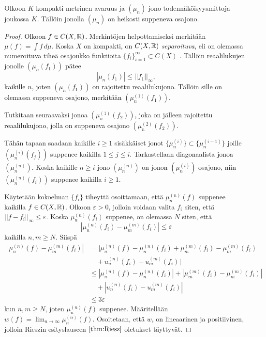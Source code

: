 \documentclass[12pt,oneside,a4paper]{amsbook} %
\begin{document}
\begin{theorem}\label{thm:probmeasureconvergence}
    Olkoon $K$ kompakti metrinen avaruus ja $(\mu_n)$ jono todennäköisyysmittoja joukossa $K$. Tällöin jonolla $(\mu_n)$ on heikosti suppeneva osajono.
\end{theorem}
\begin{proof}
    Olkoon $f \in C(X, \mathbb{R})$. Merkintöjen helpottamiseksi merkitään $\mu(f) = \int f \, d\mu$. Koska $X$ on kompakti, on $C(X, \mathbb{R})$ \textit{separoituva}, eli on olemassa numeroituva tiheä osajoukko funktioita $\{f_i\}_{i = 1}^\infty \subset C(X)$ \cite[s. 140]{conway}. Tällöin reaalilukujen jonolle $(\mu_n(f_1))$ pätee
    \begin{equation}
        |\mu_n(f_1)| \le ||f_1||_\infty,
    \end{equation}
    kaikille $n$, joten $(\mu_n(f_1))$ on rajoitettu reaalilukujono. Tällöin sille on olemassa suppeneva osajono, merkitään $(\mu_n^{(1)}(f_1))$.
    
    Tutkitaan seuraavaksi jonoa $(\mu_n^{(1)}(f_2))$, joka on jälleen rajoitettu reaalilukujono, jolla on suppeneva osajono $(\mu_n^{(2)}(f_2))$.
    
    Tähän tapaan saadaan kaikille $i \ge 1$ sisäkkäiset jonot $\{\mu_n^{(i)}\} \subset \{\mu_n^{(i-1)}\}$ joille $(\mu_n^{(i)}(f_j))$ suppenee kaikilla $1 \le j \le i$. Tarkastellaan diagonaalista jonoa $(\mu_n^{(n)})$. Koska kaikille $n \ge i$ jono $(\mu_n^{(n)})$ on jonon $(\mu_n^{(i)})$ osajono, niin $(\mu_n^{(n)}(f_i))$ suppenee kaikilla $i \ge 1$.
    
    Käytetään kokoelman $\{f_i\}$ tiheyttä osoittamaan, että $\mu_n^{(n)}(f)$ suppenee kaikilla $f \in C(X, \mathbb{R})$. Olkoon $\varepsilon > 0$, jolloin voidaan valita $f_i$ siten, että $||f-f_i||_\infty \le \varepsilon.$ Koska $\mu_n^{(n)}(f_i)$ suppenee, on olemassa $N$ siten, että 
    \begin{equation*}
        |\mu_n^{(n)}(f_i) - \mu_m^{(m)}(f_i)|\le \varepsilon
    \end{equation*}
    kaikilla $n, m \ge N$. Siispä
    \begin{align*}
        |\mu_n^{(n)}(f) - \mu_m^{(m)}(f_i)| &=  |\mu_n^{(n)}(f) - \mu_n^{(n)}(f_i) + \mu_m^{(m)}(f_i) - \mu_m^{(m)}(f_i) \\ &\quad  + u_n^{(n)}(f_i) - u_m^{(m)}(f_i) | \\
        &\le |\mu_n^{(n)}(f) - \mu_n^{(n)}(f_i)| + |\mu_m^{(m)}(f_i) - \mu_m^{(m)}(f_i)| \\ &\quad  + |u_n^{(n)}(f_i) - u_m^{(m)}(f_i) | \\
        &\le 3\varepsilon
    \end{align*}
    kun $n, m \ge N$, joten $\mu_n^{(n)}(f)$ suppenee. Määritellään $w(f) = \lim_{n \to \infty} \mu_n^{(n)}(f)$. Osoitetaan, että $w$, on lineaarinen ja positiivinen, jolloin Rieszin esityslauseen $\ref{thm:Riesz}$ oletukset täyttyvät. 
    

\end{proof}
\end{document}
